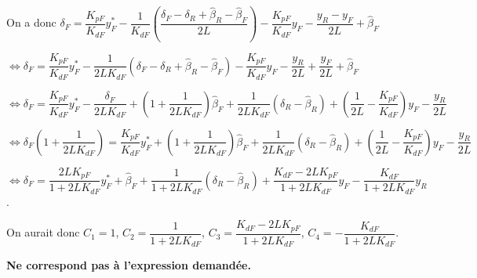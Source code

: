 \documentclass[11pt]{article}
\begin{document}
\begin{UPSTIcorrige}
On a donc 
$\delta_F  = \dfrac{K_{pF}}{K_{dF}}y_F^* - \dfrac{1}{K_{dF}}\left(  \dfrac{ \delta_F- \delta_R +\hat{\beta}_R-\hat{\beta}_F}{2L} \right) - \dfrac{K_{pF}}{K_{dF}}y_F-   \dfrac{y_R-y_F}{2L} +\hat{\beta}_F $

$\Leftrightarrow \delta_F  = \dfrac{K_{pF}}{K_{dF}}y_F^* - \dfrac{1}{2L K_{dF}}\left(   \delta_F- \delta_R +\hat{\beta}_R-\hat{\beta}_F \right) - \dfrac{K_{pF}}{K_{dF}}y_F   -   \dfrac{y_R}{2L}+   \dfrac{y_F}{2L} +\hat{\beta}_F $

$\Leftrightarrow \delta_F  = \dfrac{K_{pF}}{K_{dF}}y_F^* 
-\dfrac{ \delta_F}{2L K_{dF}}
+  \left(1+\dfrac{1}{2L K_{dF}}\right)\hat{\beta}_F
+\dfrac{1}{2L K_{dF}}\left(   \delta_R -\hat{\beta}_R \right)  
+\left( \dfrac{1}{2L}  - \dfrac{K_{pF}}{K_{dF}}\right)y_F 
- \dfrac{y_R}{2L} $

$\Leftrightarrow \delta_F  \left(1+ \dfrac{ 1}{2L K_{dF}}\right)= \dfrac{K_{pF}}{K_{dF}}y_F^* 
+  \left(1+\dfrac{1}{2L K_{dF}}\right)\hat{\beta}_F
+\dfrac{1}{2L K_{dF}}\left(   \delta_R -\hat{\beta}_R \right)  
+\left( \dfrac{1}{2L}  - \dfrac{K_{pF}}{K_{dF}}\right)y_F 
- \dfrac{y_R}{2L} $

$\Leftrightarrow \delta_F   = 
\dfrac{2L K_{pF}}{ 1+2L K_{dF}}  y_F^* 
+\hat{\beta}_F
+\dfrac{1}{ 1+2L K_{dF}} \left(   \delta_R -\hat{\beta}_R \right)  
+\dfrac{K_{dF} - 2LK_{pF}}{ 1+2L K_{dF}} y_F 
- \dfrac{ K_{dF}}{ 1+2L K_{dF}}y_R $.

On aurait donc $C_1 = 1$, $C_2 = \dfrac{1}{ 1+2L K_{dF}}$, $C_3 =\dfrac{K_{dF} - 2LK_{pF}}{ 1+2L K_{dF}} $, $C_4= - \dfrac{ K_{dF}}{ 1+2L K_{dF}} $.
\begin{flushright}
\textbf{Ne correspond pas à l'expression demandée.}
\end{flushright}
\end{UPSTIcorrige}
\end{document}
